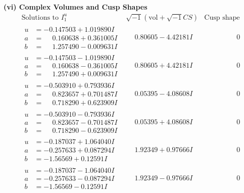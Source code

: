 \documentclass[1p]{elsarticle_modified}
\theoremstyle{definition}
\newcommand{\I}{\sqrt{-1}}
\begin{document}
\newpage\flushleft \textbf{(vi) Complex Volumes and Cusp Shapes}
$$\begin{array}{c|c|c}  
\text{Solutions to }I^u_{1}& \I (\text{vol} + \sqrt{-1}CS) & \text{Cusp shape}\\
 \hline 
\begin{aligned}
u &= -0.147503 + 1.019890 I \\
a &= \phantom{-}0.160638 + 0.361005 I \\
b &= \phantom{-}1.257490 - 0.009631 I\end{aligned}
 & \phantom{-}0.80605 - 4.42181 I & \phantom{-0.000000 } 0 \\ \hline\begin{aligned}
u &= -0.147503 - 1.019890 I \\
a &= \phantom{-}0.160638 - 0.361005 I \\
b &= \phantom{-}1.257490 + 0.009631 I\end{aligned}
 & \phantom{-}0.80605 + 4.42181 I & \phantom{-0.000000 } 0 \\ \hline\begin{aligned}
u &= -0.503910 + 0.793936 I \\
a &= \phantom{-}0.823657 + 0.701487 I \\
b &= \phantom{-}0.718290 + 0.623909 I\end{aligned}
 & \phantom{-}0.05395 - 4.08608 I & \phantom{-0.000000 } 0 \\ \hline\begin{aligned}
u &= -0.503910 - 0.793936 I \\
a &= \phantom{-}0.823657 - 0.701487 I \\
b &= \phantom{-}0.718290 - 0.623909 I\end{aligned}
 & \phantom{-}0.05395 + 4.08608 I & \phantom{-0.000000 } 0 \\ \hline\begin{aligned}
u &= -0.187037 + 1.064040 I \\
a &= -0.257633 + 0.087294 I \\
b &= -1.56569 + 0.12591 I\end{aligned}
 & \phantom{-}1.92349 + 0.97666 I & \phantom{-0.000000 } 0 \\ \hline\begin{aligned}
u &= -0.187037 - 1.064040 I \\
a &= -0.257633 - 0.087294 I \\
b &= -1.56569 - 0.12591 I\end{aligned}
 & \phantom{-}1.92349 - 0.97666 I & \phantom{-0.000000 } 0 \\ \hline\begin{aligned}

\end{aligned}
\end{array}$$
\end{document}
